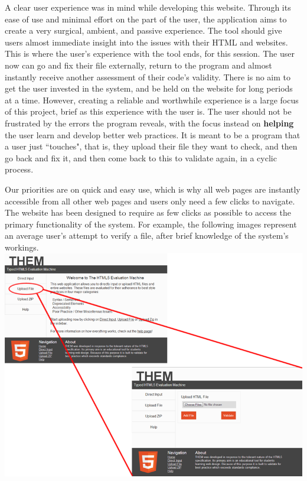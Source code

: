 \documentclass[10pt]{article}
\begin{document}
A clear user experience was in mind while developing this website. Through its ease of use and minimal effort on the part of the user, the application aims to create a very surgical, ambient, and passive experience. The tool should give users almost immediate insight into the issues with their HTML and websites. This is where the user's experience with the tool ends, for this session. The user now can go and fix their file externally, return to the program and almost instantly receive another assessment of their code's validity. There is no aim to get the user invested in the system, and be held on the website for long periods at a time. However, creating a reliable and worthwhile experience is a large focus of this project, brief as this experience with the user is. The user should not be frustrated by the errors the program reveals, with the focus instead on \textbf{helping} the user learn and develop better web practices. It is meant to be a program that a user just ``touches", that is, they upload their file they want to check, and then go back and fix it, and then come back to this to validate again, in a cyclic process.

Our priorities are on quick and easy use, which is why all web pages are instantly accessible from all other web pages and users only need a few clicks to navigate. The website has been designed to require as few clicks as possible to access the primary functionality of the system. For example, the following images represent an average user's attempt to verify a file, after brief knowledge of the system's workings. \\

\includegraphics[scale=0.5]{click1.png}
\end{document}
